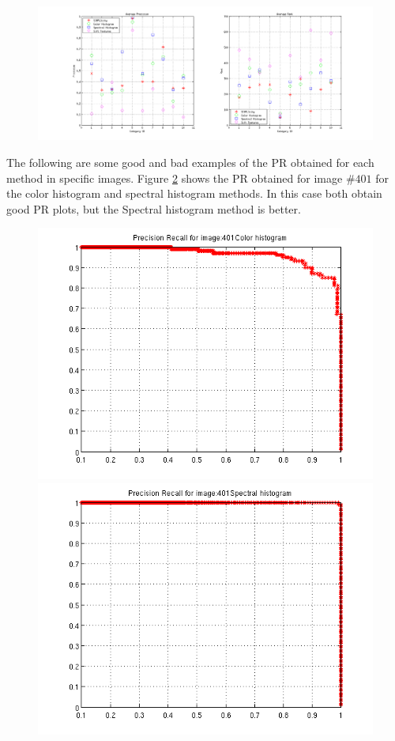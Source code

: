 \documentclass[a4paper,12pt]{article}
\begin{document}
\begin{figure}[h!]
    \centering
    \includegraphics[totalheight=.30\textheight]{./Images/AllResults.png}
    \label{fig:res}
\end{figure}

The following are some good and bad examples of the PR obtained for each method in 
specific images. Figure \ref{fig:good} shows the PR obtained for image $\#401$ for the
color histogram and spectral histogram methods. In this case both obtain good PR plots, 
but the Spectral histogram method is better. 

\begin{figure}[h!]
    \centering
    \includegraphics[totalheight=.24\textheight]{../Results/PR/GoodColor.png}
    \includegraphics[totalheight=.24\textheight]{../Results/PR/GoodSpectral.png}
    \label{fig:good}
\end{figure}
\end{document}
